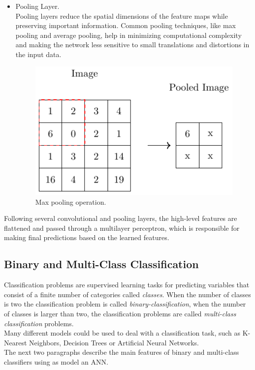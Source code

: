 \begin{itemize}
    \item Pooling Layer.\\
    Pooling layers reduce the spatial dimensions of the feature maps while preserving important information. Common pooling techniques, 
    like max pooling and average pooling, help in minimizing computational complexity and making the network less sensitive to small translations 
    and distortions in the input data.

    \begin{figure}[h]
    \centering
    \includegraphics[scale=0.7]{Chapters/Chapter2/pooling/pooling.pdf}
    \caption{Max pooling operation.}
    \end{figure}
\end{itemize}

Following several convolutional and pooling layers, the high-level features are flattened and passed through a multilayer perceptron, which is
responsible for making final predictions based on the learned features.


\subsection{Binary and Multi-Class Classification}

Classification problems are supervised learning tasks for predicting variables that consist of a finite number of categories called
\textit{classes}. 
When the number of classes is two the classification problem is called \textit{binary-classification}, when the number of classes is larger than
two, the classification problems are called \textit{multi-class classification} problems. \\
Many different models could be used to deal with a classification task, such as K-Nearest Neighbors, Decision
Trees or Artificial Neural Networks.\\
The next two paragraphs describe the main features of binary and multi-class classifiers using as model an ANN.



